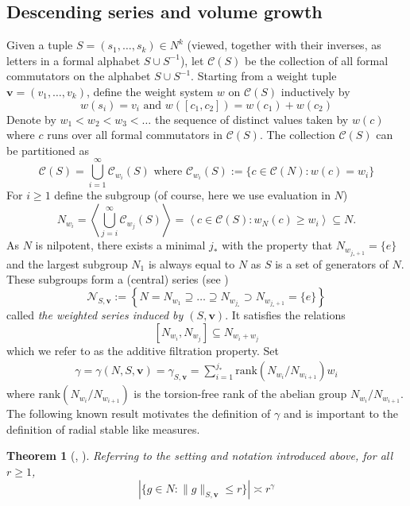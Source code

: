 \documentclass[pdflatex,sn-mathphys-num]{sn-jnl}%
\theoremstyle{thmstyleone}%
\newtheorem{theo}{Theorem}%
\theoremstyle{thmstyletwo}%
\theoremstyle{thmstylethree}%
\begin{document}
\subsection{Descending series and volume growth}
\label{sec: series}
Given a tuple $S=(s_1,\dots,s_k)\in N^k$ (viewed, together with their inverses, as letters in a formal alphabet $S\cup S^{-1}$), 
let $\mathcal{C}(S)$ be the collection of all formal commutators on the alphabet $S\cup S^{-1}.$  Starting from a weight tuple $\mathbf v=(v_1,\dots,v_k)$, define the weight system $w$ on $\mathcal{C}(S)$ inductively by 
$$  w(s_i) = v_i \text{ and }  w ([c_1,c_2] )= w(c_1) +  w (c_2)$$
Denote by $w_1< w_2 < w_3 < \ldots $ the sequence  of distinct values taken by $w(c)$ where $c$ runs over all formal commutators in $\mathcal{C}(S)$. The collection $\mathcal{C}(S)$ can be partitioned as 
$$\mathcal{C}(S) = \bigcup_{i=1}^\infty \mathcal{C}_{w_i}(S)  \text{ where } \mathcal{C}_{w_i}(S) := \{c \in \mathcal{C}(N): w(c) = w_i\} $$
For $i \ge 1$ define the subgroup (of course, here we use evaluation in $N$)
$$N_{w_i} =  \left\langle \bigcup_{j=i}^\infty \mathcal{C}_{w_j}(S)  \right \rangle =   \left\langle c \in  \mathcal{C}(S): w_N(c) \ge w_i\right \rangle \subseteq N.$$
As $N$ is nilpotent, there exists a minimal $j_*$ with the property that $N_{w_{j_* + 1}}= \{e\}$ and the  largest subgroup $N_1$ is always equal to $N$ as $S$ is a set of generators of $N$. 
These subgroups form a (central) series (see \cite{SCZ-nil})
$$ \mathcal{N}_{S,\mathbf{v}} := \left\{N =  N_{w_1} \supseteq \ldots \supseteq N_{w_{j_*}}   \supset N_{w_{j_* + 1}}  = \{e\}\right\}$$
    called \textit{the weighted series induced by $(S,\mathbf v)$}. It satisfies the relations
$$[N_{w_i},N_{w_j}]\subseteq N_{w_{i} + w_j}$$
which we refer to as the additive filtration property.  Set 
\begin{align}
\label{eq: gamma}
    \gamma =\gamma(N,S,\mathbf v)=\gamma_{S,\mathbf v}= \sum_{i=1}^{j_*} \mbox{rank}(N_{w_i}/N_{w_{i+1}}) w_i  
\end{align}
where $\mbox{rank}(N_{w_i}/N_{w_{i+1}})$ is the torsion-free rank of the abelian group $N_{w_i}/N_{w_{i+1}}$. The following known result motivates the definition of $\gamma$ and is important to the definition of radial stable like measures.

 \begin{theo}[{\cite[Theorem 3.2.1]{CKSCWZ}}, {\cite[Th. 3.2 and Rm. 3.3]{SCZ-nil}}]
\label{thm:norm_comp}  Referring to the setting and notation introduced above, for all $r \ge 1$, 
    $$\left|\{g \in N: \|g\|_{S,\mathbf v} \le r\}\right|  \asymp r^{\gamma}$$
\end{theo}
\end{document}
